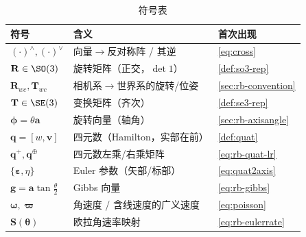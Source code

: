 \begin{table}[H]\centering\small
\caption{符号表}
\begin{tabular}{lll}
\toprule
符号 & 含义 & 首次出现 \\
\midrule
$(\cdot)^\wedge,(\cdot)^\vee$ & 向量$\to$反对称阵 / 其逆 & \cref{eq:cross} \\
$\mathbf{R}\in\SO(3)$ & 旋转矩阵（正交，$\det1$） & \cref{def:so3-rep} \\
$\mathbf{R}_{wc},\mathbf{T}_{wc}$ & 相机系$\to$世界系的旋转/位姿 & \cref{sec:rb-convention} \\
$\mathbf{T}\in\SE(3)$ & 变换矩阵（齐次） & \cref{def:se3-rep} \\
$\boldsymbol{\phi}=\theta\mathbf{a}$ & 旋转向量（轴角） & \cref{sec:rb-axisangle} \\
$\mathbf{q}=[w,\mathbf{v}]$ & 四元数（Hamilton，实部在前） & \cref{def:quat} \\
$\mathbf{q}^{+},\mathbf{q}^{\oplus}$ & 四元数左乘/右乘矩阵 & \cref{eq:rb-quat-lr} \\
$\{\boldsymbol{\varepsilon},\eta\}$ & Euler 参数（矢部/标部） & \cref{eq:quat2axis} \\
$\mathbf{g}=\mathbf{a}\tan\tfrac{\theta}{2}$ & Gibbs 向量 & \cref{eq:rb-gibbs} \\
$\boldsymbol{\omega},\boldsymbol{\varpi}$ & 角速度 / 含线速度的广义速度 & \cref{eq:poisson} \\
$\mathbf{S}(\boldsymbol{\theta})$ & 欧拉角速率映射 & \cref{eq:rb-eulerrate} \\
\bottomrule
\end{tabular}
\end{table}

